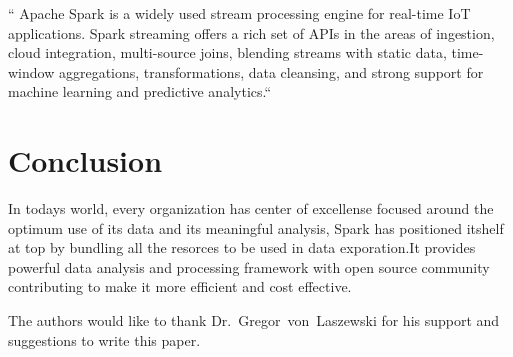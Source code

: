 `` Apache Spark is a widely used stream processing engine for real-time IoT applications. Spark streaming
offers a rich set of APIs in the areas of ingestion, cloud integration, multi-source joins, blending streams
with static data, time-window aggregations, transformations, data cleansing, and strong support for machine
learning and predictive analytics.``~\cite{hid-sp18-522-deepcore}


\section{Conclusion}

In todays world, every organization has center of excellense focused around the optimum use of its data and
its meaningful analysis, Spark has positioned itshelf at top by bundling all the resorces to be used in data
exporation.It provides powerful data analysis and processing framework with open source community 
contributing to make it more efficient and cost effective. 


\begin{acks}

  The authors would like to thank Dr.~Gregor~von~Laszewski for his
  support and suggestions to write this paper.

\end{acks}


 











